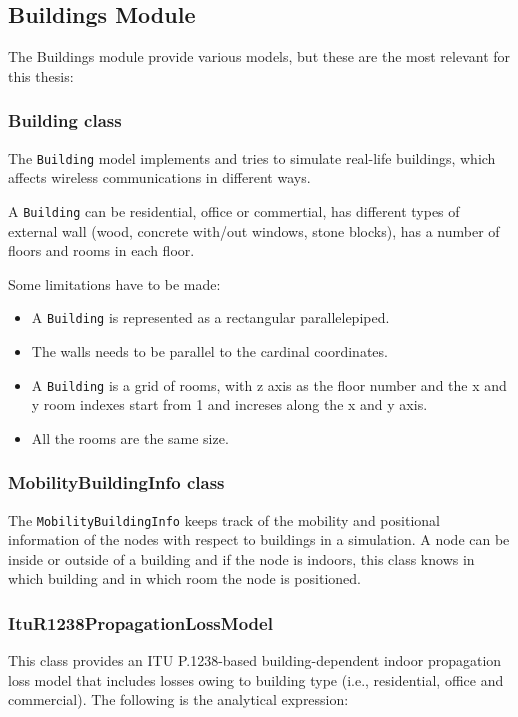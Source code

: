 \subsection{Buildings Module}
The Buildings module provide various models, but these are the most relevant for this thesis:

\subsubsection{Building class}

The \texttt{Building} model implements and tries to simulate real-life buildings, which affects
wireless communications in different ways.

A \texttt{Building} can be residential, office or commertial, has different types of external
wall (wood, concrete with/out windows, stone blocks), has a number of floors and rooms in each floor.

Some limitations have to be made:
\begin{itemize}[topsep=0pt]
  \item A \texttt{Building} is represented as a rectangular parallelepiped.
  \item The walls needs to be parallel to the cardinal coordinates.
  \item A \texttt{Building} is a grid of rooms, with z axis as the floor number and the x and y room
  indexes start from 1 and increses along the x and y axis.
  \item All the rooms are the same size.
\end{itemize}

\subsubsection{MobilityBuildingInfo class}

The \texttt{MobilityBuildingInfo} keeps track of the mobility and positional information of 
the nodes with respect to buildings in a simulation. A node can be inside or outside of
a building and if the node is indoors, this class knows in which building and in which room
the node is positioned.

\subsubsection{ItuR1238PropagationLossModel}

This class provides an ITU P.1238-based building-dependent indoor propagation loss model 
that includes losses owing to building type (i.e., residential, office and commercial). 
The following is the analytical expression:

